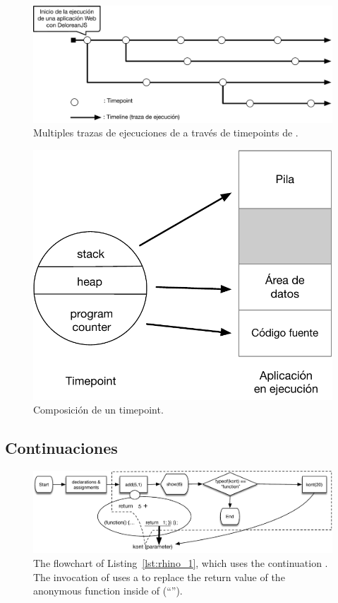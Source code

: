 \documentclass[conference]{IEEEtran}
\begin{document}
\begin{figure}[t]
\begin{center}
\includegraphics[width=.5\linewidth]{fig-timeline}
\caption{Multiples trazas de ejecuciones de a trav\'es de timepoints de \deloreanjs.}
\label{fig:timeline}
\end{center}
\end{figure}


\begin{figure}[t]
\begin{center}
\includegraphics[width=.5\linewidth]{fig-timepoint}
\caption{Composici\'on de un timepoint.}
\label{fig:timepoint}
\end{center}
\end{figure}




\subsection{Continuaciones}
\label{sec:continuaciones}


\begin{figure}[t]
\begin{center}
\includegraphics[width=.7\linewidth]{fig-kont}
\caption{The flowchart of Listing~\ref{lst:rhino_1}, which uses the continuation
  . The invocation of  uses a  to replace the
  return value of the anonymous function inside of  (\ie ``'').}
\label{fig:kont}
\end{center}
\end{figure}
\end{document}

